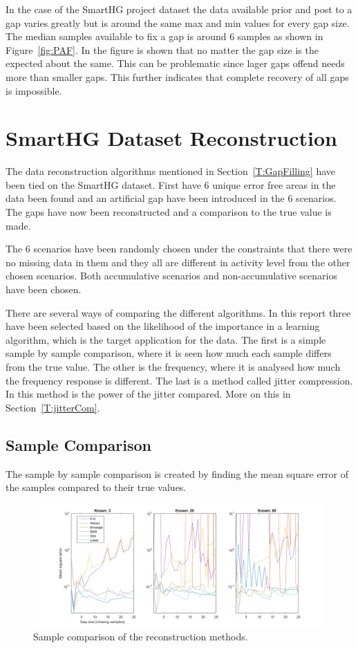 In the case of the SmartHG project dataset the data available prior and post to a gap varies greatly but is around the same max and min values for every gap size. The median samples available to fix a gap is around 6 samples as shown in Figure~\ref{fig:PAF}. In the figure is shown that no matter the gap size is the expected  about the same. This can be problematic since lager gaps offend needs more  than smaller gaps. This further indicates that complete recovery of all gaps is impossible. 

\newpage

\section{SmartHG Dataset Reconstruction}
The data reconstruction algorithms mentioned in Section~\ref{T:GapFilling} have been tied on the SmartHG dataset. First have 6 unique error free areas in the data been found and an artificial gap have been introduced in the 6 scenarios. 
The gaps have now been reconstructed and a comparison to the true value is made. 

The 6 scenarios have been randomly chosen under the constraints that there were no missing data in them and they all are different in activity level from the other chosen scenarios. Both accumulative scenarios and non-accumulative scenarios have been chosen. 

There are several ways of comparing the different algorithms. In this report three have been selected based on the likelihood of the importance in a learning algorithm, which is the target application for the data. The first is a simple sample by sample comparison, where it is seen how much each sample differs from the true value. The other is the frequency, where it is analysed how much the frequency response is different. The last is a method called jitter compression. In this method is the power of the jitter compared. More on this in Section~\ref{T:jitterCom}.

\subsection{Sample Comparison}
The sample by sample comparison is created by finding the mean square error of the samples compared to their true values.  

\begin{figure}[H]
\centering
\includegraphics[width=1\textwidth]{billeder/RecNorm.png}
\caption{Sample comparison of the reconstruction methods.}
\label{fig:RecNorm}
\end{figure}


